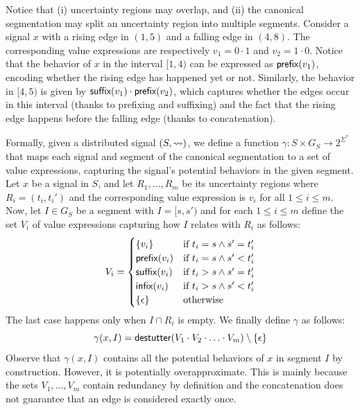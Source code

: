 Notice that (i) uncertainty regions may overlap, and (ii) the canonical segmentation may split an uncertainty region into multiple segments.
Consider a signal $x$ with a rising edge in $(1,5)$ and a falling edge in $(4,8)$.
The corresponding value expressions are respectively $v_1 = 0 \cdot 1$ and $v_2 = 1 \cdot 0$.
Notice that the behavior of $x$ in the interval $[1,4)$ can be expressed as $\textsf{prefix}(v_1)$, encoding whether the rising edge has happened yet or not.
Similarly, the behavior in $[4,5)$ is given by $\textsf{suffix}(v_1) \cdot \textsf{prefix}(v_2)$, which captures whether the edges occur in this interval (thanks to prefixing and suffixing) and the fact that the rising edge happens before the falling edge (thanks to concatenation).

Formally, given a distributed signal $(S,{\rightsquigarrow})$, we define a function $\gamma : S \times G_S \to 2^{\Sigma^*}$ that maps each signal and segment of the canonical segmentation to a set of value expressions, capturing the signal's potential behaviors in the given segment.
Let $x$ be a signal in $S$, and let $R_1, \ldots, R_m$ be its uncertainty regions where $R_i = (t_i, t_i')$ and the corresponding value expression is $v_i$ for all $1 \leq i \leq m$.
Now, let $I \in G_S$ be a segment with $I = [s, s')$ and for each $1 \leq i \leq m$ define the set $V_i$ of value expressions capturing how $I$ relates with $R_i$ as follows:
%
\small
\begin{equation} \label{eq:valexprset}
	V_i = 
	\begin{cases}
		\{v_i\} & \text{if } t_i = s \land s' = t_i' \\
		\textsf{prefix}(v_i) & \text{if } t_i = s \land s' < t_i' \\
		\textsf{suffix}(v_i) & \text{if } t_i > s \land s' = t_i' \\
		\textsf{infix}(v_i) & \text{if } t_i > s \land s' < t_i' \\
		\{\epsilon\} & \text{otherwise}
	\end{cases}
\end{equation}
\normalsize
{}The last case happens only when $I \cap R_i$ is 
empty.
We finally define $\gamma$ as follows:
\[ \gamma(x,I) = \mathsf{destutter}(V_1 \cdot V_2 \cdot \ldots \cdot V_m) \setminus \{\epsilon\} \]
Observe that $\gamma(x,I)$ contains all the potential behaviors of $x$ in segment $I$ by construction.
However, it is potentially overapproximate.
This is mainly because the sets $V_1, \ldots, V_m$ contain redundancy by definition and the concatenation does not guarantee that an edge is considered exactly once.

